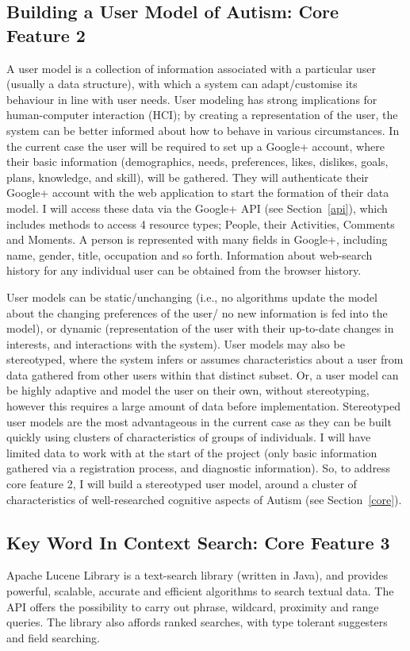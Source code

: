 \documentclass[a4paper, 10pt]{article}
\begin{document}
\subsection {Building a User Model of Autism: Core Feature 2}\label{usermodel}
A user model is a collection of information associated with a particular user (usually a data structure), with which a system can adapt/customise its behaviour in line with user needs. User modeling has strong implications for human-computer interaction (HCI); by creating a representation of the user, the system can be better informed about how to behave in various circumstances. In the current case the user will be required to set up a Google+ account, where their basic information (demographics, needs, preferences, likes, dislikes, goals, plans, knowledge, and skill), will be gathered. They will authenticate their Google+ account with the web application to start the formation of their data model. I will access these data via the Google+ API (see Section~\ref{api}), which includes methods to access 4 resource  types; People, their Activities, Comments and Moments. A person is represented with many fields in Google+, including name, gender, title, occupation and so forth. Information about web-search history for any individual user can be obtained from the browser history. 

User models can be static/unchanging (i.e., no algorithms update the model about the changing preferences of the user/ no new information is fed into the model), or dynamic (representation of the user with their up-to-date changes in interests, and interactions with the system). User models may also be stereotyped, where the system infers or assumes characteristics about a user from data gathered from other users within that distinct subset. Or, a user model can be highly adaptive and model the user on their own, without stereotyping, however this requires a large amount of data before implementation. Stereotyped user models are the most advantageous in the current case as they can be built quickly using clusters of characteristics of groups of individuals. I will have limited data to work with at the start of the project (only basic information gathered via a registration process, and diagnostic information). So, to address core feature 2, I will build a stereotyped user model, around a cluster of characteristics of well-researched cognitive aspects of Autism (see Section~\ref{core}).

\subsection{Key Word In Context Search: Core Feature 3}\label{apache}
Apache Lucene Library is a text-search library (written in Java), and provides powerful, scalable, accurate and efficient algorithms to search textual data. The API offers the possibility to carry out phrase, wildcard, proximity and range queries. The library also affords ranked searches, with type tolerant suggesters and field searching.
\end{document}
